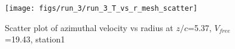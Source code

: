 \begin{figure}[H]
\centering
\texttt{[image: figs/run\_3/run\_3\_T\_vs\_r\_mesh\_scatter]}
\caption{Scatter plot of azimuthal velocity vs radius at $z/c$=5.37, $V_{free}$=19.43, station1}
\label{fig:run_3_T_vs_r_mesh_scatter}
\end{figure}


